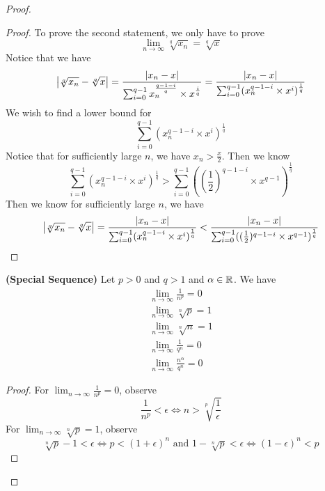 \documentclass{report}
\begin{document}
\begin{proof}
\begin{proof}
To prove the second statement, we only have to prove
\begin{equation}
\lim_{n\to\infty} \sqrt[q]{x_n} =\sqrt[q]{x} 
\end{equation}
Notice that we have
\begin{equation}
\left|\sqrt[q]{x_n}-\sqrt[q]{x}\right|=\frac{\left|x_n-x\right|}{\sum_{i=0}^{q-1}x_n^{\frac{q-1-i}{q}}\times x^{\frac{i}{q}}}=\frac{\left|x_n-x\right|}{\sum_{i=0}^{q-1}(x_n^{q-1-i}\times x^i)^{\frac{1}{q}}}
\end{equation}
We wish to find a lower bound for 
\begin{equation}
\sum_{i=0}^{q-1}(x_n^{q-1-i}\times x^i)^{\frac{1}{q}}
\end{equation}
Notice that for sufficiently large $n$, we have $x_n>\frac{x}{2}$. Then we know
 \begin{equation}
\sum_{i=0}^{q-1}(x_n^{q-1-i}\times x^i)^{\frac{1}{q}}>\sum_{i=0}^{q-1}((\frac{1}{2})^{q-1-i}\times x^{q-1} )^{\frac{1}{q}}
\end{equation}
Then we know for sufficiently large $n$, we have
 \begin{equation}
\left|\sqrt[q]{x_n}-\sqrt[q]{x} \right|=\frac{\left|x_n-x\right|}{\sum_{i=0}^{q-1}(x_n^{q-1-i}\times x^i)^{\frac{1}{q}}}<\frac{\left|x_n-x\right|}{\sum_{i=0}^{q-1}((\frac{1}{2})^{q-1-i}\times x^{q-1})^{\frac{1}{q}}}
\end{equation}
\end{proof}
\begin{theorem}
\label{2.1.9}
\textbf{(Special Sequence)} Let $p>0$ and $q>1$ and $\alpha \in\mathbb{R}$. We have
\begin{gather}
\lim_{n\to\infty}\frac{1}{n^p}=0\\
\lim_{n\to\infty}\sqrt[n]{p}=1\\
\lim_{n\to\infty}\sqrt[n]{n}=1\\
\lim_{n\to\infty}\frac{1}{q^n}=0\\
\lim_{n\to\infty}\frac{n^{\alpha }}{q^n}=0
\end{gather}
\end{theorem}
\begin{proof}
For $\lim_{n\to\infty}\frac{1}{n^p}=0$, observe
\begin{equation}
\frac{1}{n^p}<\epsilon \iff n>\sqrt[p]{\frac{1}{\epsilon }}  
\end{equation}
For $\lim_{n\to\infty}\sqrt[n]{p}=1$, observe
\begin{equation}
\sqrt[n]{p}-1<\epsilon  \iff p<(1+\epsilon )^n\text{ and }1-\sqrt[n]{p}<\epsilon \iff (1-\epsilon )^n<p  
\end{equation}

\end{proof}
\end{proof}
\end{document}
